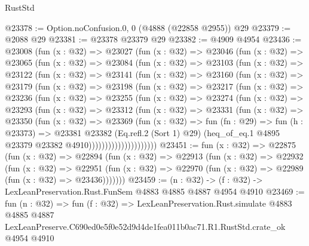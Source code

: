 \begin{lexlean}{RustStd}
\begin{coremodule}
@23378 := Option.noConfusion.{0, 0} (@4888 (@22858 @2955)) @29
@23379 := @2088 @29
@23381 := @23378 @23379 @29
@23382 := @4909 @4954
@23436 := @23008
    (fun (x : @32) =>
    @23027
      (fun (x : @32) =>
      @23046
        (fun (x : @32) =>
        @23065
          (fun (x : @32) =>
          @23084
            (fun (x : @32) =>
            @23103
              (fun (x : @32) =>
              @23122
                (fun (x : @32) =>
                @23141
                  (fun (x : @32) =>
                  @23160
                    (fun (x : @32) =>
                    @23179
                      (fun (x : @32) =>
                      @23198
                        (fun (x : @32) =>
                        @23217
                          (fun (x : @32) =>
                          @23236
                            (fun (x : @32) =>
                            @23255
                              (fun (x : @32) =>
                              @23274
                                (fun (x : @32) =>
                                @23293
                                  (fun (x : @32) =>
                                  @23312
                                    (fun (x : @32) =>
                                    @23331
                                      (fun (x : @32) =>
                                      @23350
                                        (fun (x : @32) =>
                                        @23369
                                          (fun (x : @32) =>
                                          fun (fn : @29) =>
                                          fun (h : @23373) =>
                                          @23381
                                            @23382
                                            (Eq.refl.{2} (Sort 1) @29)
                                            (heq_of_eq.{1}
                                              @4895
                                              @23379
                                              @23382
                                              @4910)))))))))))))))))))))
@23451 := fun (x : @32) =>
  @22875
    (fun (x : @32) =>
    @22894
      (fun (x : @32) =>
      @22913
        (fun (x : @32) =>
        @22932
          (fun (x : @32) =>
          @22951 (fun (x : @32) => @22970 (fun (x : @32) => @22989 (fun (x : @32) => @23436)))))))
@23459 := (n : @32) -> (f : @32) -> LexLeanPreservation.Rust.FunSem @4883 @4885 @4887 @4954 @4910
@23469 := fun (n : @32) =>
  fun (f : @32) =>
  LexLeanPreservation.Rust.simulate
    @4883
    @4885
    @4887
    LexLeanPreserve.C690ed0e5f0e52d9d4de1fea011b0ac71.R1.RustStd.crate_ok
    @4954
    @4910
\end{coremodule}
\end{lexlean}
